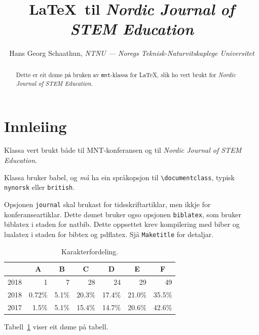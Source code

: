 \documentclass[nynorsk,journal,biblatex]{mnt}
\title{\LaTeX\ til \emph{Nordic Journal of STEM Education}}
\author{Hans Georg Schaathun,
\emph{NTNU --- Noregs Teknisk-Naturvitskaplege Universitet}}
\begin{document}
\maketitle

\begin{abstract}
   Dette er eit døme på bruken av \texttt{mnt}-klassa for
   \LaTeX, slik ho vert brukt for \emph{Nordic Journal of STEM Education}.
\end{abstract}

\section{Innleiing}

Klassa vert brukt både til MNT-konferansen og til
\emph{Nordic Journal of STEM Education}.

Klassa bruker babel, og \emph{må} ha ein språkopsjon til
\verb|\documentclass|, typisk \texttt{nynorsk} eller \texttt{british}.

Opsjonen \texttt{journal} skal brukast for tidsskriftartiklar, 
men ikkje for konferanseartiklar.
Dette dømet bruker ogso opsjonen \texttt{biblatex}, som bruker
biblatex i staden for natbib.  Dette oppsettet krev kompilering
med biber og lualatex i staden for bibtex og pdflatex.  Sjå 
\texttt{Maketitle} for detaljar.

\begin{table}
\centering
  \caption{Karakterfordeling.}
  \begin{tabular}{l|r|r|r|r|r|r|}
     & \multicolumn{1}{c|}{A}
     & \multicolumn{1}{c|}{B}
     & \multicolumn{1}{c|}{C}
     & \multicolumn{1}{c|}{D}
     & \multicolumn{1}{c|}{E}
     & \multicolumn{1}{c|}{F} \\
  \hline
  2018 & 1 & 7 & 28 & 24 & 29 & 49 \\
  \hline
  2018 &
  \num{0.72}\% &
  \num{5.1}\% &
  \num{20.3}\% &
  \num{17.4}\% &
  \num{21.0}\% &
  \num{35.5}\%  \\
  \hline
  2017 &
  \num{1.5}\% &
  \num{5.1}\% &
  \num{15.4}\% &
  \num{14.7}\% &
  \num{20.6}\% &
  \num{42.6}\% \\
  \hline
  \end{tabular}
  \label{tab:grade}
\end{table}


Tabell~\ref{tab:grade} viser eit døme på tabell.
\end{document}
